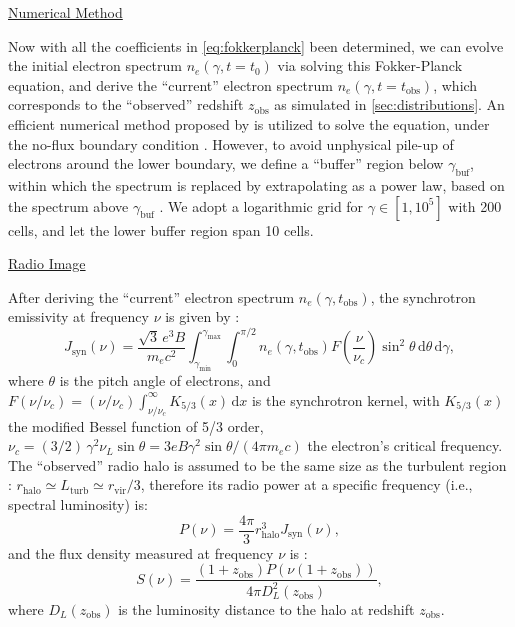 \documentclass[modern]{aastex62}
\newcommand{\R}[1]{\mathrm{#1}}
\newcommand{\D}[1]{\R{d} #1}
\begin{document}
\vspace{1ex}
\uline{Numerical Method}

Now with all the coefficients in \autoref{eq:fokkerplanck} been determined,
we can evolve the initial electron spectrum $n_e(\gamma, t=t_0)$ via
solving this Fokker-Planck equation, and derive the \enquote{current}
electron spectrum $n_e(\gamma, t=t_{\R{obs}})$, which corresponds to the
\enquote{observed} redshift $z_{\R{obs}}$ as simulated in \autoref{sec:distributions}.
An efficient numerical method proposed by \citet{chang1970} is utilized
to solve the equation, under the no-flux boundary condition \citep{park1996}.
However, to avoid unphysical pile-up of electrons around the lower boundary,
we define a \enquote{buffer} region below $\gamma_{\R{buf}}$, within which
the spectrum is replaced by extrapolating as a power law, based on the
spectrum above $\gamma_{\R{buf}}$ \citep{donnert2014}.
We adopt a logarithmic grid for $\gamma \in [1, 10^5]$ with 200 cells,
and let the lower buffer region span 10 cells.

\vspace{1ex}
\uline{Radio Image}

After deriving the \enquote{current} electron spectrum
$n_e(\gamma, t_{\R{obs}})$, the synchrotron emissivity at frequency
$\nu$ is given by \citep{rybicki1979}:
\begin{equation}
  \label{sec:jnu-sync}
  J_{\R{syn}}(\nu) = \frac{\sqrt{3} \, e^3 B}{m_e c^2}
    \int_{\gamma_{\R{min}}}^{\gamma_{\R{max}}} \!\!\int_0^{\pi/2}
    n_e(\gamma, t_{\R{obs}}) F\!\left( \frac{\nu}{\nu_c} \right)
    \sin^2 \!\theta \,\D{\theta} \,\D{\gamma},
\end{equation}
where $\theta$ is the pitch angle of electrons,
and $F(\nu/\nu_c) = (\nu/\nu_c) \int_{\nu/\nu_c}^{\infty} K_{5/3}(x) \,\D{x}$
is the synchrotron kernel,
with $K_{5/3}(x)$ the modified Bessel function of 5/3 order,
$\nu_c = (3/2) \,\gamma^2 \nu_L \sin\theta
= 3 e B \gamma^2 \sin\theta / (4\pi m_e c)$
the electron's critical frequency.
The \enquote{observed} radio halo is assumed to be the same size as
the turbulent region \citep[e.g.,][]{vazza2011}:
$r_{\R{halo}} \simeq L_{\R{turb}} \simeq r_{\R{vir}}/3$,
therefore its radio power at a specific frequency (i.e., spectral luminosity) is:
\begin{equation}
  \label{eq:halo-power}
  P(\nu) = \frac{4\pi}{3} r_{\R{halo}}^3 J_{\R{syn}}(\nu),
\end{equation}
and the flux density measured at frequency $\nu$ is \citep[e.g.,][]{hogg1999}:
\begin{equation}
  \label{eq:halo-flux}
  S(\nu) = \frac{(1+z_{\R{obs}}) P(\nu(1+z_{\R{obs}}))}{4\pi D_L^2(z_{\R{obs}})},
\end{equation}
where $D_L(z_{\R{obs}})$ is the luminosity distance to the halo at
redshift $z_{\R{obs}}$.
\end{document}
